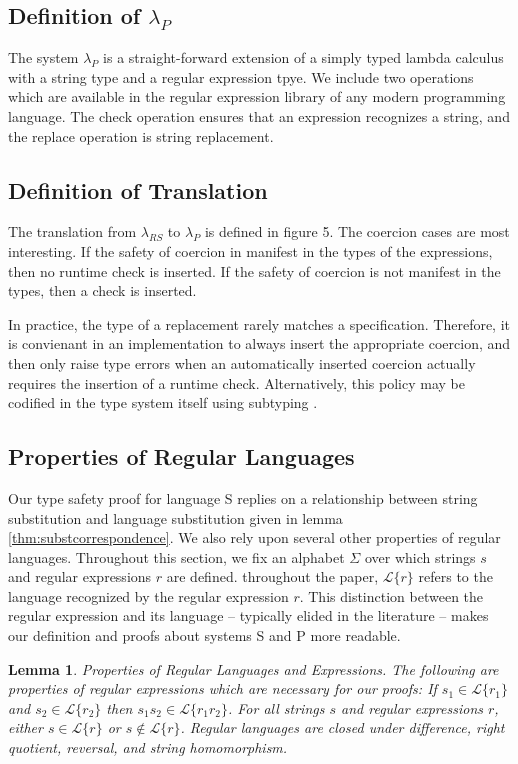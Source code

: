\documentclass[9pt]{sig-alternate}
\newtheorem{lem}[thm]{Lemma}
\theoremstyle{definition}
\newcommand{\Lagr}{\mathcal{L}}
\newcommand{\lang}[1]{\Lagr\{#1\}}
\newcommand{\lambdas}{\lambda_{RS}}
\newcommand{\lambdap}{\lambda_P}
\begin{document}
\subsection{Definition of $\lambdap$}

The system $\lambdap$ is a straight-forward extension of a simply typed lambda calculus
with a string type and a regular expression tpye. We include two operations which are available in the regular expression
library of any modern programming language. The check operation ensures that an expression
recognizes a string, and the replace operation is string replacement.

\subsection{Definition of Translation}

The translation from $\lambdas$ to $\lambdap$ is defined in figure 5.
The coercion cases are most interesting. If the safety of coercion in manifest in the
types of the expressions, then no runtime check is inserted.
If the safety of coercion is not manifest in the types, then a check is inserted.

In practice, the type of a replacement rarely matches a specification.
Therefore, it is convienant in an implementation to always insert the appropriate
coercion, and then only raise type errors when an automatically inserted coercion
actually requires the insertion of a runtime check. Alternatively, this policy may 
be codified in the type system itself using subtyping \cite{fulton12}.

\subsection{Properties of Regular Languages}

Our type safety proof for language S replies on a relationship between
string substitution and language substitution given in lemma \ref{thm:substcorrespondence}.
We also rely upon several other properties of regular languages.
Throughout this section, we fix an alphabet $\Sigma$ over which strings $s$ and
regular expressions $r$ are defined. throughout the paper, $\lang{r}$ refers to the
language recognized by the regular expression $r$. This distinction between the regular expression
and its language -- typically elided in the literature -- makes our definition and
proofs about systems S and P more readable.

\begin{lem}{Properties of Regular Languages and Expressions.} \label{thm:regexprops}
The following are properties of regular expressions which are necessary for our proofs:
If $s_1 \in \lang{r_1}$ and $s_2 \in \lang{r_2}$ then $s_1s_2 \in \lang{r_1r_2}$.
For all strings $s$ and regular expressions $r$, either $s \in \lang{r}$ or $s \not \in \lang{r}$.
Regular languages are closed under difference, right quotient, reversal, and string homomorphism.
\end{lem}
\end{document}
